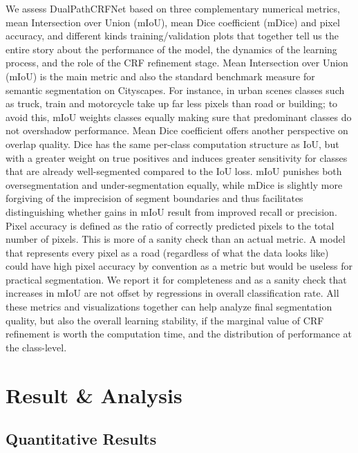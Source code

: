 \documentclass[conference]{IEEEtran}
\begin{document}
We assess DualPathCRFNet based on three complementary numerical metrics, mean Intersection over
Union (mIoU), mean Dice coefficient (mDice) and pixel accuracy, and different kinds training/validation
plots that together tell us the entire story about the performance of the model, the dynamics of the learning
process, and the role of the CRF refinement stage. Mean Intersection over Union (mIoU) is the main metric
and also the standard benchmark measure for semantic segmentation on Cityscapes. For instance, in urban
scenes classes such as truck, train and motorcycle take up far less pixels than road or building; to avoid
this, mIoU weights classes equally making sure that predominant classes do not overshadow performance.
Mean Dice coefficient offers another perspective on overlap quality. Dice has the same per-class
computation structure as IoU, but with a greater weight on true positives and induces greater sensitivity
for classes that are already well-segmented compared to the IoU loss. mIoU punishes both oversegmentation and under-segmentation equally, while mDice is slightly more forgiving of the imprecision
of segment boundaries and thus facilitates distinguishing whether gains in mIoU result from improved
recall or precision. Pixel accuracy is defined as the ratio of correctly predicted pixels to the total number
of pixels. This is more of a sanity check than an actual metric. A model that represents every pixel as a
road (regardless of what the data looks like) could have high pixel accuracy by convention as a metric but
would be useless for practical segmentation. We report it for completeness and as a sanity check that
increases in mIoU are not offset by regressions in overall classification rate. All these metrics and
visualizations together can help analyze final segmentation quality, but also the overall learning stability,
if the marginal value of CRF refinement is worth the computation time, and the distribution of performance
at the class-level.

 
\section{Result \& Analysis}\label{sec:results}

\subsection{Quantitative Results}\label{subsec:quant}
\end{document}
